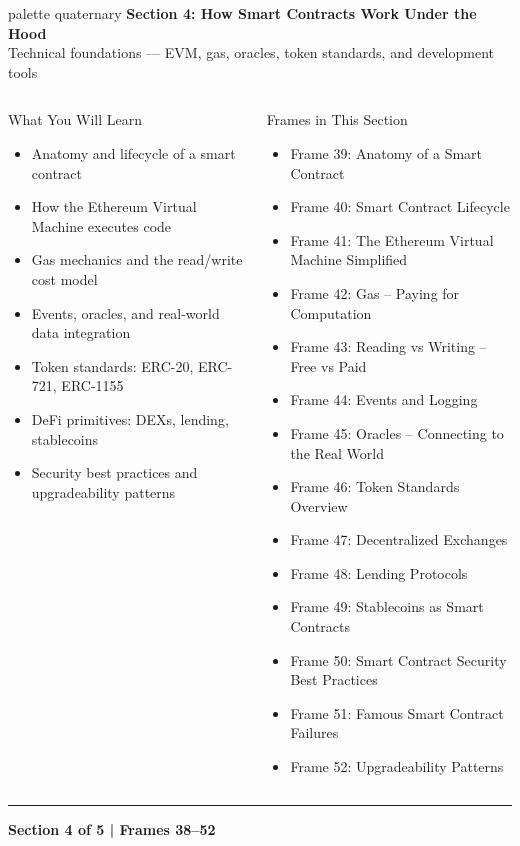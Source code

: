 \documentclass[8pt,aspectratio=169]{beamer}
\newcommand{\bottomnote}[1]{\vfill\vspace{-2mm}\textcolor{mllavender2}{\rule{\textwidth}{0.4pt}}\vspace{1mm}\footnotesize\textbf{#1}}
\begin{document}
\begin{frame}{}
\begin{beamercolorbox}[sep=12pt,center,rounded=true,shadow=true]{palette quaternary}
  {\Large\bfseries Section 4: How Smart Contracts Work Under the Hood}\\[6pt]
  {\normalsize Technical foundations --- EVM, gas, oracles, token standards, and development tools}
\end{beamercolorbox}
\vspace{4mm}
\begin{columns}[T]
\begin{block}{What You Will Learn}
\footnotesize
\begin{itemize}
  \item Anatomy and lifecycle of a smart contract
  \item How the Ethereum Virtual Machine executes code
  \item Gas mechanics and the read/write cost model
  \item Events, oracles, and real-world data integration
  \item Token standards: ERC-20, ERC-721, ERC-1155
  \item DeFi primitives: DEXs, lending, stablecoins
  \item Security best practices and upgradeability patterns
\end{itemize}
\end{block}
\begin{block}{Frames in This Section}
\footnotesize
\begin{itemize}
  \item Frame 39: Anatomy of a Smart Contract
  \item Frame 40: Smart Contract Lifecycle
  \item Frame 41: The Ethereum Virtual Machine Simplified
  \item Frame 42: Gas -- Paying for Computation
  \item Frame 43: Reading vs Writing -- Free vs Paid
  \item Frame 44: Events and Logging
  \item Frame 45: Oracles -- Connecting to the Real World
  \item Frame 46: Token Standards Overview
  \item Frame 47: Decentralized Exchanges
  \item Frame 48: Lending Protocols
  \item Frame 49: Stablecoins as Smart Contracts
  \item Frame 50: Smart Contract Security Best Practices
  \item Frame 51: Famous Smart Contract Failures
  \item Frame 52: Upgradeability Patterns
\end{itemize}
\end{block}
\end{columns}
\bottomnote{Section 4 of 5 | Frames 38--52}
\end{frame}
\end{document}
